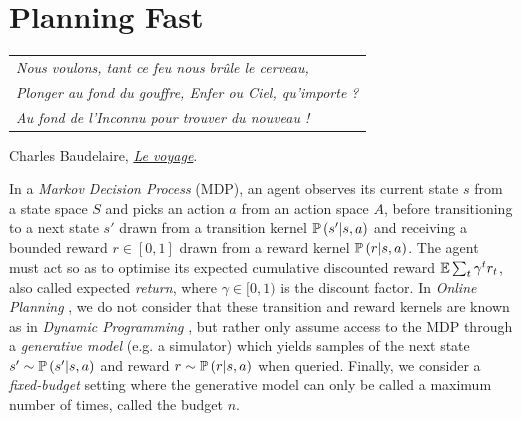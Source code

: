 
\graphicspath{{2-Chapters/6-Chapter/}}

\chapter{Planning Fast}
\label{chapter:6}

\begin{flushright}
	\begin{tabular}{@{}l@{}}
		\emph{Nous voulons, tant ce feu nous brûle le cerveau,}\\
		\emph{Plonger au fond du gouffre, Enfer ou Ciel, qu’importe ?}\\
		\emph{Au fond de l’Inconnu pour trouver du nouveau !}\\
	\end{tabular}
	
	Charles Baudelaire, \href{https://eleurent.github.io/sisyphe/texts/le-voyage.html}{\emph{Le voyage}}.
\end{flushright}

\abstractStartChapter{}%

In a \emph{Markov Decision Process} (MDP), an agent observes its current state $s$ from a state space $S$ and picks an action $a$ from an action space $A$, before transitioning to a next state $s'$ drawn from a transition kernel $\mathbb{P}\left(s'|s,a\right)$ and receiving a bounded reward $r\in[0, 1]$ drawn from a reward kernel $\mathbb{P}\left(r|s, a\right)$. The agent must act so as to optimise its expected cumulative discounted reward $\operatorname*{\mathbb{E}} \sum_t \gamma^t r_t$, also called expected \emph{return}, where $\gamma\in[0,1)$ is the discount factor. In \emph{Online Planning} \cite{Munos2014}, we do not consider that these transition and reward kernels are known as in \emph{Dynamic Programming} \citep{Bellman1957}, but rather only assume access to the MDP through a \emph{generative model} (e.g. a simulator) which yields samples of the next state $s' \sim \mathbb{P}\left(s'|s,a\right)$ and reward $r\sim\mathbb{P}\left(r|s, a\right)$ when queried. Finally, we consider a \emph{fixed-budget} setting where the generative model can only be called a maximum number of times, called the budget $n$. 

\minitocStartChapter{}

